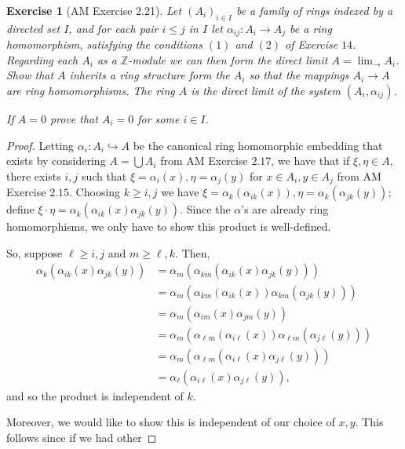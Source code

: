 \documentclass[12pt,letterpaper]{article}
\newtheorem{problem}{Exercise}[section]
\theoremstyle{definition}
\theoremstyle{remark}
\numberwithin{figure}{problem}
\numberwithin{equation}{section}
\begin{document}
\begin{problem}[AM Exercise 2.21]
  Let
  $(A_i)_{i \in
    I}$ be a family of rings indexed by a directed set
  $I$, and for each pair
  $i \le
  j$ in
  $I$ let
  $\alpha_{ij} : A_i \to
  A_j$ be a ring homomorphism, satisfying the conditions
  $(1)$ and
  $(2)$ of Exercise
  $14$.
  Regarding each
  $A_i$ as a
  $\mathbb{Z}$-module we can then form the direct limit
  $A = \displaystyle\lim_{\longrightarrow}
  A_i$.
  Show that
  $A$ inherits a ring structure form the
  $A_i$ so that the mappings
  $A_i \to
  A$ are ring homomorphisms.
  The ring
  $A$ is the \emph{direct limit} of the system
  $(A_i,\alpha_{ij})$.
  \par If
  $A=0$ prove that
  $A_i =
  0$ for some
  $i \in
  I$.
\end{problem}
\begin{proof}
  Letting
  $\alpha_i : A_i \hookrightarrow
  A$ be the canonical ring homomorphic embedding that exists by considering
  $A = \bigcup
  A_i$ from AM Exercise
  $2.17$, we have that if
  $\xi,\eta \in
  A$, there exists
  $i,j$ such that
  $\xi = \alpha_i(x), \eta =
  \alpha_j(y)$ for
  $x \in A_i, y \in
  A_j$ from AM Exercise
  $2.15$.
  Choosing
  $k \geqslant
  i,j$ we have
  $\xi = \alpha_k(\alpha_{ik}(x)), \eta =
  \alpha_k(\alpha_{jk}(y))$; define
  $\xi\cdot\eta =
  \alpha_k(\alpha_{ik}(x)\alpha_{jk}(y))$.
  Since the
  $\alpha$'s are already ring homomorphisms, we only have to show this product is well-defined.
  \par So, suppose
  $\ell \geqslant
  i,j$ and
  $m \geqslant
  \ell,k$.
  Then,
  \begin{align*}
    \alpha_k(\alpha_{ik}(x)\alpha_{jk}(y)) &%
    = \alpha_m(\alpha_{km}(\alpha_{ik}(x)\alpha_{jk}(y)))\\
    &%
    = \alpha_m(\alpha_{km}(\alpha_{ik}(x))\alpha_{km}(\alpha_{jk}(y)))\\
    &%
    = \alpha_m(\alpha_{im}(x)\alpha_{jm}(y))\\
    &%
    = \alpha_m(\alpha_{\ell m}(\alpha_{i\ell}(x))\alpha_{\ell m}(\alpha_{j\ell}(y)))\\
    &%
    = \alpha_m(\alpha_{\ell m}(\alpha_{i\ell}(x)\alpha_{j\ell}(y)))\\
    &%
    = \alpha_\ell(\alpha_{i\ell}(x)\alpha_{j\ell}(y)),
  \end{align*}
  and so the product is independent of
  $k$.
  \par Moreover, we would like to show this is independent of our choice of
  $x,y$.
  This follows since if we had other

\end{proof}
\end{document}
